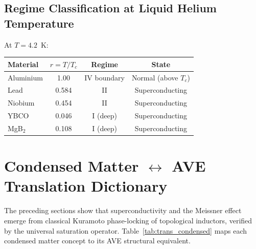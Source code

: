 \subsection{Regime Classification at Liquid Helium Temperature}

At $T = 4.2$~K:
\begin{center}
\begin{tabular}{lccc}
\toprule
\textbf{Material} & $r = T/T_c$ & \textbf{Regime} & \textbf{State} \\
\midrule
Aluminium & 1.00  & IV boundary & Normal (above $T_c$) \\
Lead      & 0.584 & II          & Superconducting \\
Niobium   & 0.454 & II          & Superconducting \\
YBCO      & 0.046 & I (deep)    & Superconducting \\
MgB$_2$   & 0.108 & I (deep)    & Superconducting \\
\bottomrule
\end{tabular}
\end{center}

\section{Condensed Matter $\leftrightarrow$ AVE Translation Dictionary}
\label{sec:cm_ave_translation}

The preceding sections show that superconductivity and the Meissner effect emerge from classical Kuramoto phase-locking of topological inductors, verified by the universal saturation operator.  Table~\ref{tab:trans_condensed} maps each condensed matter concept to its AVE structural equivalent.



